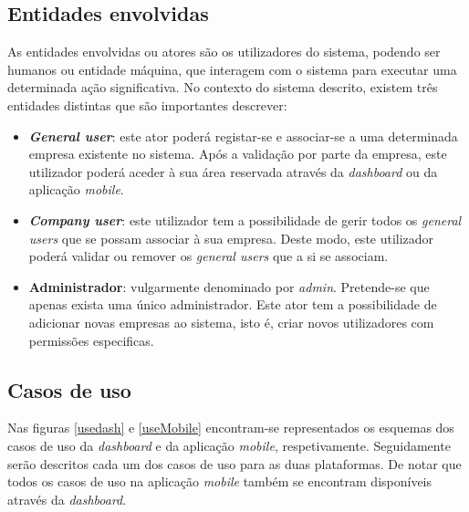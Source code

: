 \subsection{Entidades envolvidas}

As entidades envolvidas ou atores são os utilizadores do sistema, podendo ser humanos ou entidade máquina, que interagem com o sistema para executar uma determinada ação significativa. No contexto do sistema descrito, existem três entidades distintas que são importantes descrever: 

\begin{itemize}
	
	\item \textbf{\textit{General user}}: este ator poderá registar-se e associar-se a uma determinada empresa existente no sistema. Após a validação por parte da empresa, este utilizador poderá aceder à sua área reservada através da \textit{dashboard} ou da aplicação \textit{mobile}. 
	
	\item \textbf{\textit{Company user}}: este utilizador tem a possibilidade de gerir todos os \textit{general users} que se possam associar à sua empresa. Deste modo, este utilizador poderá validar ou remover os \textit{general users} que a si se associam. 
	
	\item \textbf{Administrador}: vulgarmente denominado por \textit{admin}. Pretende-se que apenas exista uma único administrador. Este ator tem a possibilidade de adicionar novas empresas ao sistema, isto é, criar novos utilizadores com permissões especificas. 
	
\end{itemize}




\subsection{Casos de uso}

Nas figuras \ref{usedash} e \ref{useMobile} encontram-se representados os esquemas dos casos de uso da \textit{dashboard} e da aplicação \textit{mobile}, respetivamente.
Seguidamente serão descritos cada um dos casos de uso para as duas plataformas. De notar que todos os casos de uso na aplicação \textit{mobile} também se encontram disponíveis através da \textit{dashboard}. 



